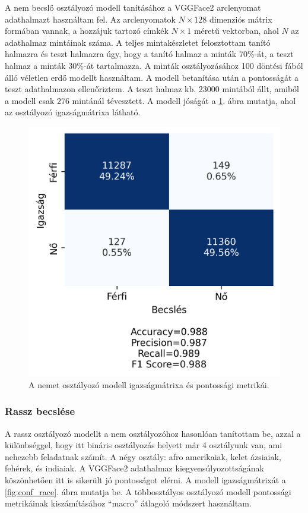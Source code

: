 A nem becslő osztályozó modell tanításához a VGGFace2 arclenyomat adathalmazt használtam fel. Az arclenyomatok $N\times128$ dimenziós mátrix formában vannak, a hozzájuk tartozó címkék $N\times1$ méretű vektorban, ahol $N$ az adathalmaz mintáinak száma. A teljes mintakészletet felosztottam tanító halmazra és teszt halmazra úgy, hogy a tanító halmaz a minták 70\%-át, a teszt halmaz a minták 30\%-át tartalmazza. A minták osztályozásához 100 döntési fából álló véletlen erdő modellt használtam. A modell betanítása után a pontosságát a teszt adathalmazon ellenőriztem. A teszt halmaz kb. 23000 mintából állt, amiből a modell csak 276 mintánál tévesztett. A modell jóságát a \ref{fig:conf_sex}. ábra mutatja, ahol az osztályozó igazságmátrixa látható. 

\begin{figure}[ht]
	\centering
	\includegraphics[width=0.5\columnwidth]{figures/conf_sex.png}
	\caption{A nemet osztályozó modell igazságmátrixa és pontossági metrikái.}
	\label{fig:conf_sex}
\end{figure}

\subsubsection*{Rassz becslése}
A rassz osztályozó modellt a nem osztályozóhoz hasonlóan tanítottam be, azzal a különbséggel, hogy itt bináris osztályozás helyett már 4 osztályunk van, ami nehezebb feladatnak számít. A négy osztály: afro amerikaiak, kelet ázsiaiak, fehérek, és indiaiak. A VGGFace2 adathalmaz kiegyensúlyozottságának köszönhetően itt is sikerült jó pontosságot elérni. A modell igazságmátrixát a \ref{fig:conf_race}. ábra mutatja be. A többosztályos osztályozó modell pontossági metrikáinak kiszámításához ``macro'' átlagoló módszert használtam.

